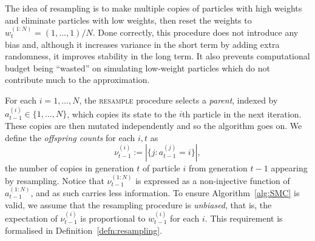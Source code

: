 The idea of resampling is to make multiple copies of particles with high weights and eliminate particles with low weights, then reset the weights to $w_t^{(1:N)} = (1,\dots,1)/N$. Done correctly, this procedure does not introduce any bias and, although it increases variance in the short term by adding extra randomness, it improves stability in the long term.
It also prevents computational budget being ``wasted'' on simulating low-weight particles which do not contribute much to the approximation.

For each $i=1,\dots,N$, the \textsc{resample} procedure selects a \emph{parent}, indexed by $a_{t-1}^{(i)} \in \{1,\dots,N\}$, which copies its state to the $i$th particle in the next iteration. These copies are then mutated independently and so the algorithm goes on.
We define the \emph{offspring counts} for each $i,t$ as
\begin{equation*}
\nu_{t-1}^{(i)} := |\{ j: a_{t-1}^{(j)} = i \}| ,
\end{equation*}
the number of copies in generation $t$ of particle $i$ from generation $t-1$ appearing by resampling. Notice that $\nu_{t-1}^{(1:N)}$ is expressed as a non-injective function of $a_{t-1}^{(1:N)}$, and as such carries less information.
To ensure Algorithm~\ref{alg:SMC} is valid, we assume that the resampling procedure
is \emph{unbiased}, that is, the expectation of $\nu_{t-1}^{(i)}$ is proportional to $w_{t-1}^{(i)}$ for each $i$. This requirement is formalised in Definition~\ref{defn:resampling}.

